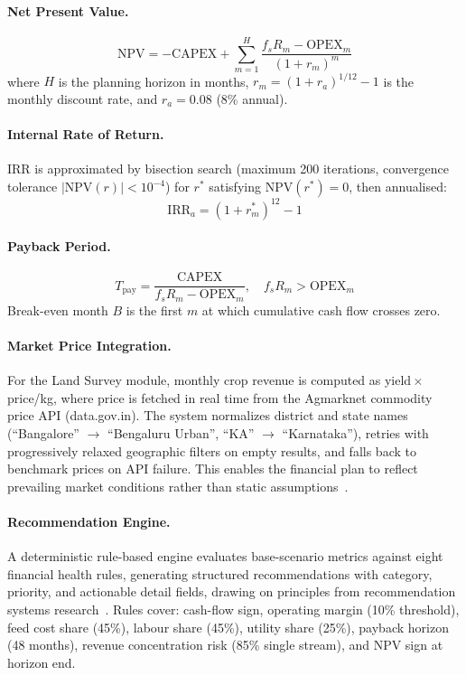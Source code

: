 \documentclass[runningheads]{llncs}
\begin{document}
\paragraph{Net Present Value.}
\begin{equation}
  \mathrm{NPV} = -\mathrm{CAPEX} +
    \sum_{m=1}^{H}
      \frac{f_s R_m - \mathrm{OPEX}_m}{(1+r_m)^{m}}
  \label{eq:npv}
\end{equation}
where $H$ is the planning horizon in months,
$r_m = (1+r_a)^{1/12}-1$ is the monthly discount rate,
and $r_a = 0.08$ (8\% annual).

\paragraph{Internal Rate of Return.}
IRR is approximated by bisection search (maximum 200 iterations,
convergence tolerance $|\mathrm{NPV}(r)| < 10^{-4}$) for $r^*$
satisfying $\mathrm{NPV}(r^*)=0$, then annualised:
\begin{equation}
  \mathrm{IRR}_a = (1 + r^*_m)^{12} - 1
  \label{eq:irr}
\end{equation}

\paragraph{Payback Period.}
\begin{equation}
  T_{\mathrm{pay}} = \frac{\mathrm{CAPEX}}{f_s R_m - \mathrm{OPEX}_m},
  \quad f_s R_m > \mathrm{OPEX}_m
  \label{eq:payback}
\end{equation}
Break-even month $B$ is the first $m$ at which cumulative cash flow
crosses zero.

\paragraph{Market Price Integration.}
For the Land Survey module, monthly crop revenue is computed as
yield\,$\times$\,price/kg, where price is fetched in real time from
the Agmarknet commodity price API (data.gov.in). The system normalizes
district and state names (``Bangalore'' $\rightarrow$ ``Bengaluru
Urban'', ``KA'' $\rightarrow$ ``Karnataka''), retries with
progressively relaxed geographic filters on empty results, and falls
back to benchmark prices on API failure. This enables the financial
plan to reflect prevailing market conditions rather than static
assumptions~\cite{ref11,ref17}.

\paragraph{Recommendation Engine.}
A deterministic rule-based engine evaluates base-scenario metrics
against eight financial health rules, generating structured
recommendations with category, priority, and actionable detail
fields, drawing on principles from recommendation systems
research~\cite{ref34}.
Rules cover: cash-flow sign, operating margin (10\% threshold), feed
cost share (45\%), labour share (45\%), utility share (25\%), payback
horizon (48 months), revenue concentration risk (85\% single stream),
and NPV sign at horizon end.
\end{document}
